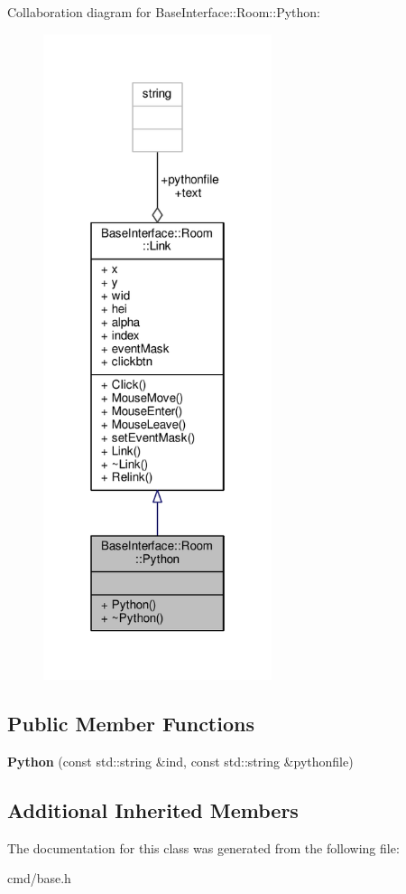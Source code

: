 Collaboration diagram for Base\+Interface\+:\+:Room\+:\+:Python\+:
\nopagebreak
\begin{figure}[H]
\begin{center}
\leavevmode
\includegraphics[width=190pt]{de/d77/classBaseInterface_1_1Room_1_1Python__coll__graph}
\end{center}
\end{figure}
\subsection*{Public Member Functions}
\begin{DoxyCompactItemize}
\item 
{\bfseries Python} (const std\+::string \&ind, const std\+::string \&pythonfile)\hypertarget{classBaseInterface_1_1Room_1_1Python_a18004e22e75822306b76d1f6bb555df4}{}\label{classBaseInterface_1_1Room_1_1Python_a18004e22e75822306b76d1f6bb555df4}

\end{DoxyCompactItemize}
\subsection*{Additional Inherited Members}


The documentation for this class was generated from the following file\+:\begin{DoxyCompactItemize}
\item 
cmd/base.\+h\end{DoxyCompactItemize}
